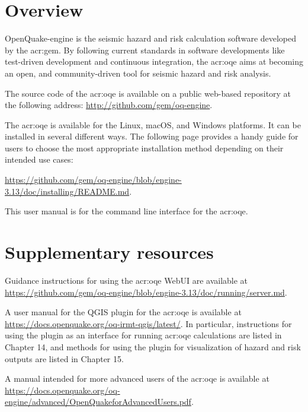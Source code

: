 \section{Overview}

OpenQuake-engine is the seismic hazard and risk calculation software developed by
the \glsdesc{acr:gem}. By following current standards in software
developments like test-driven development and continuous integration, the
\glsdesc{acr:oqe} aims at becoming an open, and community-driven tool for
seismic hazard and risk analysis.

The source code of the \glsdesc{acr:oqe} is available on a public web-based
repository at the following address:
\href{http://github.com/gem/oq-engine}{http://github.com/gem/oq-engine}.

The \glsdesc{acr:oqe} is available for the Linux, macOS, and Windows
platforms. It can be installed in several different ways. The following page
provides a handy guide for users to choose the most appropriate installation
method depending on their intended use cases:

\href{https://github.com/gem/oq-engine/blob/engine-3.13/doc/installing/README.md}{https://github.com/gem/oq-engine/blob/engine-3.13/doc/installing/README.md}.

This user manual is for the command line interface for the \glsdesc{acr:oqe}.


\section{Supplementary resources}

Guidance instructions for using the \glsdesc{acr:oqe} WebUI are available 
at \href{https://github.com/gem/oq-engine/blob/engine-3.13/doc/running/server.md}{https://github.com/gem/oq-engine/blob/engine-3.13/doc/running/server.md}.

A user manual for the QGIS plugin for the \glsdesc{acr:oqe} is available at 
\href{https://docs.openquake.org/oq-irmt-qgis/latest/}{https://docs.openquake.org/oq-irmt-qgis/latest/}. 
In particular, instructions for using the plugin as an interface for running \glsdesc{acr:oqe}
calculations are listed in Chapter 14, and methods for using the plugin for visualization 
of hazard and risk outputs are listed in Chapter 15.

A manual intended for more advanced users of the \glsdesc{acr:oqe} is available
at \href{https://docs.openquake.org/oq-engine/advanced/OpenQuakeforAdvancedUsers.pdf}{https://docs.openquake.org/oq-engine/advanced/OpenQuakeforAdvancedUsers.pdf}.

